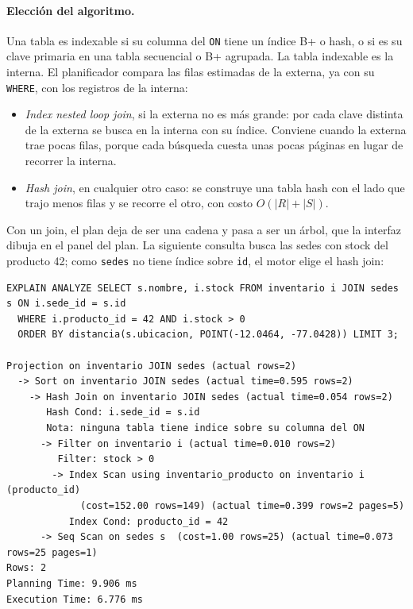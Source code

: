 \documentclass[11pt,a4paper]{article}
\begin{document}
\paragraph{Elección del algoritmo.} Una tabla es indexable si su columna del \texttt{ON} tiene un índice B+ o hash, o si es su clave primaria en una tabla secuencial o B+ agrupada. La tabla indexable es la interna. El planificador compara las filas estimadas de la externa, ya con su \texttt{WHERE}, con los registros de la interna:

\begin{itemize}
  \item \emph{Index nested loop join}, si la externa no es más grande: por cada clave distinta de la externa se busca en la interna con su índice. Conviene cuando la externa trae pocas filas, porque cada búsqueda cuesta unas pocas páginas en lugar de recorrer la interna.
  \item \emph{Hash join}, en cualquier otro caso: se construye una tabla hash con el lado que trajo menos filas y se recorre el otro, con costo $O(|R| + |S|)$.
\end{itemize}

Con un join, el plan deja de ser una cadena y pasa a ser un árbol, que la interfaz dibuja en el panel del plan. La siguiente consulta busca las sedes con stock del producto 42; como \texttt{sedes} no tiene índice sobre \texttt{id}, el motor elige el hash join:

\begin{lstlisting}
EXPLAIN ANALYZE SELECT s.nombre, i.stock FROM inventario i JOIN sedes s ON i.sede_id = s.id
  WHERE i.producto_id = 42 AND i.stock > 0
  ORDER BY distancia(s.ubicacion, POINT(-12.0464, -77.0428)) LIMIT 3;

Projection on inventario JOIN sedes (actual rows=2)
  -> Sort on inventario JOIN sedes (actual time=0.595 rows=2)
    -> Hash Join on inventario JOIN sedes (actual time=0.054 rows=2)
       Hash Cond: i.sede_id = s.id
       Nota: ninguna tabla tiene indice sobre su columna del ON
      -> Filter on inventario i (actual time=0.010 rows=2)
         Filter: stock > 0
        -> Index Scan using inventario_producto on inventario i (producto_id)
             (cost=152.00 rows=149) (actual time=0.399 rows=2 pages=5)
           Index Cond: producto_id = 42
      -> Seq Scan on sedes s  (cost=1.00 rows=25) (actual time=0.073 rows=25 pages=1)
Rows: 2
Planning Time: 9.906 ms
Execution Time: 6.776 ms
\end{lstlisting}
\end{document}
